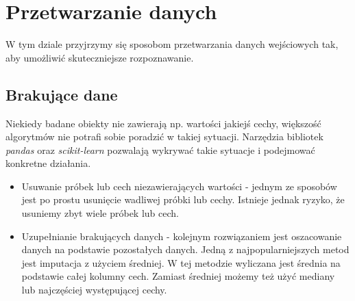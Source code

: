 \documentclass[printmode, eng, openany]{mgr}
\newcommand\tab[1][1cm]{\hspace*{#1}}
\begin{document}
\section{Przetwarzanie danych}
\tab W tym dziale przyjrzymy się sposobom przetwarzania danych wejściowych tak, aby umożliwić skuteczniejsze rozpoznawanie.
\subsection{Brakujące dane}
\tab Niekiedy badane obiekty nie zawierają np. wartości jakiejś cechy, większość algorytmów nie potrafi sobie poradzić w takiej sytuacji. Narzędzia bibliotek \textit{pandas} oraz \textit{scikit-learn} pozwalają wykrywać takie sytuacje i podejmować konkretne działania.
\begin{itemize}
\item Usuwanie próbek lub cech niezawierających wartości - jednym ze sposobów jest po prostu usunięcie wadliwej próbki lub cechy. Istnieje jednak ryzyko, że usuniemy zbyt wiele próbek lub cech.
\item Uzupełnianie brakujących danych - kolejnym rozwiązaniem jest oszacowanie danych na podstawie pozostałych danych. Jedną z najpopularniejszych metod jest imputacja z użyciem średniej. W tej metodzie wyliczana jest średnia na podstawie całej kolumny cech. Zamiast średniej możemy też użyć mediany lub najczęściej występującej cechy.
\end{itemize}
\end{document}
